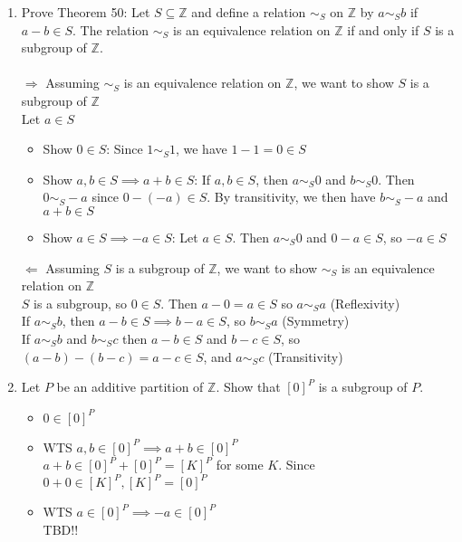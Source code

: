 \documentclass[11pt]{article}
\begin{document}
\begin{enumerate}
\newpage %
\item Prove Theorem 50: Let $S \subseteq \mathbb{Z}$ and define a relation $\sim_S$ on $\mathbb{Z}$ by $a \sim_S b$ if $a-b \in S$.  The relation $\sim_S$ is an equivalence relation on $\mathbb{Z}$ if and only if $S$ is a subgroup of $\mathbb{Z}$.\\
\\
$\Rightarrow$ Assuming $\sim_S$ is an equivalence relation on $\mathbb{Z}$, we want to show $S$ is a subgroup of $\mathbb{Z}$
\\
Let $a \in S$
\begin{itemize}
\item Show $0 \in S$: Since $1 \sim_S 1$, we have $1-1=0 \in S$
\item Show $a, b \in S \implies a + b \in S$:  If $a, b \in S$, then $a \sim_S 0$ and $b \sim_S 0$.  Then $0 \sim_S -a$ since $0 - (-a) \in S$.  By transitivity, we then have $b \sim_S -a$ and $a + b \in S$  
\item Show $a \in S \implies -a \in S$:  Let $a \in S$.  Then $a \sim_S 0$ and $0 - a \in S$, so $-a \in S$
\end{itemize}
$\Leftarrow$ Assuming $S$ is a subgroup of $\mathbb{Z}$, we want to show $\sim_S$ is an equivalence relation on $\mathbb{Z}$
\\
$S$ is a subgroup, so $0 \in S$.  Then $a - 0 = a \in S$ so $a \sim_S a$ (Reflexivity)
\\
If $a \sim_S b$, then $a - b \in S \implies b -a \in S$, so $b \sim_S a$ (Symmetry)
\\
If $a \sim_S b$ and $b \sim_S c$ then $a -b \in S$ and $b -c \in S$, so $(a -b) - (b -c) = a -c \in S$, and $a \sim_S c$ (Transitivity)
\newpage %
\item Let $P$ be an additive partition of $\mathbb{Z}$. Show that $[0]^P$ is a subgroup of $P$.
\\
\begin{itemize}
\item $0 \in [0]^P$
\item WTS $a,b \in [0]^P \implies a + b \in [0]^P$\\
$a + b \in [0]^P + [0]^P = [K]^P$ for some $K$.  Since $ 0 + 0 \in [K]^P, [K]^P = [0]^P$
\item WTS $a \in [0]^P \implies -a \in [0]^P$\\
TBD!!
\end{itemize}


\end{enumerate}
\end{document}
